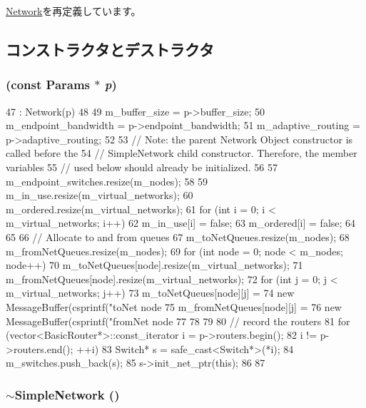 \hyperlink{classNetwork_a5ebe6802acb5e6e05b54303c1004f080}{Network}を再定義しています。

\subsection{コンストラクタとデストラクタ}
\hypertarget{classSimpleNetwork_a29ff459fd60dd92b122e772fcb931a03}{
\subsubsection[{SimpleNetwork}]{ (const {\bf Params} $\ast$ {\em p})}}
\label{classSimpleNetwork_a29ff459fd60dd92b122e772fcb931a03}



\begin{DoxyCode}
47     : Network(p)
48 {
49     m_buffer_size = p->buffer_size;
50     m_endpoint_bandwidth = p->endpoint_bandwidth;
51     m_adaptive_routing = p->adaptive_routing;
52 
53     // Note: the parent Network Object constructor is called before the
54     // SimpleNetwork child constructor.  Therefore, the member variables
55     // used below should already be initialized.
56 
57     m_endpoint_switches.resize(m_nodes);
58 
59     m_in_use.resize(m_virtual_networks);
60     m_ordered.resize(m_virtual_networks);
61     for (int i = 0; i < m_virtual_networks; i++) {
62         m_in_use[i] = false;
63         m_ordered[i] = false;
64     }
65 
66     // Allocate to and from queues
67     m_toNetQueues.resize(m_nodes);
68     m_fromNetQueues.resize(m_nodes);
69     for (int node = 0; node < m_nodes; node++) {
70         m_toNetQueues[node].resize(m_virtual_networks);
71         m_fromNetQueues[node].resize(m_virtual_networks);
72         for (int j = 0; j < m_virtual_networks; j++) {
73             m_toNetQueues[node][j] =
74                 new MessageBuffer(csprintf("toNet node %
75             m_fromNetQueues[node][j] =
76                 new MessageBuffer(csprintf("fromNet node %
77         }
78     }
79 
80     // record the routers
81     for (vector<BasicRouter*>::const_iterator i = p->routers.begin();
82          i != p->routers.end(); ++i) {
83         Switch* s = safe_cast<Switch*>(*i);
84         m_switches.push_back(s);
85         s->init_net_ptr(this);
86     }
87 }
\end{DoxyCode}
\hypertarget{classSimpleNetwork_a8cfee54f29326681efd0c8df51b6f197}{
\subsubsection[{$\sim$SimpleNetwork}]{\setlength{\rightskip}{0pt plus 5cm}$\sim${\bf SimpleNetwork} ()}}
\label{classSimpleNetwork_a8cfee54f29326681efd0c8df51b6f197}



